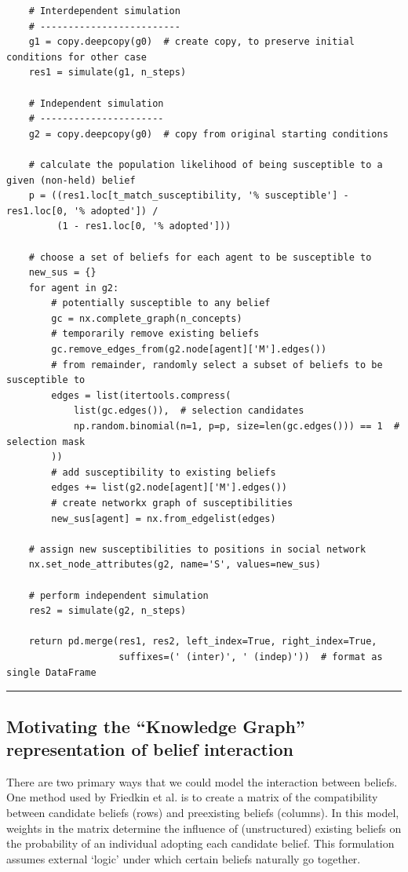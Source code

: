 \documentclass{article}
\begin{document}
\begin{verbatim}
    # Interdependent simulation
    # -------------------------
    g1 = copy.deepcopy(g0)  # create copy, to preserve initial conditions for other case
    res1 = simulate(g1, n_steps)

    # Independent simulation
    # ----------------------
    g2 = copy.deepcopy(g0)  # copy from original starting conditions

    # calculate the population likelihood of being susceptible to a given (non-held) belief
    p = ((res1.loc[t_match_susceptibility, '% susceptible'] - res1.loc[0, '% adopted']) /
         (1 - res1.loc[0, '% adopted']))

    # choose a set of beliefs for each agent to be susceptible to
    new_sus = {}
    for agent in g2:
        # potentially susceptible to any belief
        gc = nx.complete_graph(n_concepts)  
        # temporarily remove existing beliefs
        gc.remove_edges_from(g2.node[agent]['M'].edges())  
        # from remainder, randomly select a subset of beliefs to be susceptible to
        edges = list(itertools.compress(
            list(gc.edges()),  # selection candidates
            np.random.binomial(n=1, p=p, size=len(gc.edges())) == 1  # selection mask
        ))
        # add susceptibility to existing beliefs
        edges += list(g2.node[agent]['M'].edges())  
        # create networkx graph of susceptibilities
        new_sus[agent] = nx.from_edgelist(edges)  

    # assign new susceptibilities to positions in social network
    nx.set_node_attributes(g2, name='S', values=new_sus)  
    
    # perform independent simulation
    res2 = simulate(g2, n_steps)  

    return pd.merge(res1, res2, left_index=True, right_index=True,
                    suffixes=(' (inter)', ' (indep)'))  # format as single DataFrame

\end{verbatim}

\hrule

\subsection{Motivating the ``Knowledge Graph'' representation of belief interaction}
There are two primary ways that we could model the interaction between beliefs. One method used by Friedkin et al. \cite{friedkin2016network} is to create a matrix of the compatibility between candidate beliefs (rows) and preexisting beliefs (columns). In this model, weights in the matrix determine the influence of (unstructured) existing beliefs on the probability of an individual adopting each candidate belief. This formulation assumes external `logic' under which certain beliefs naturally go together. 
\end{document}
